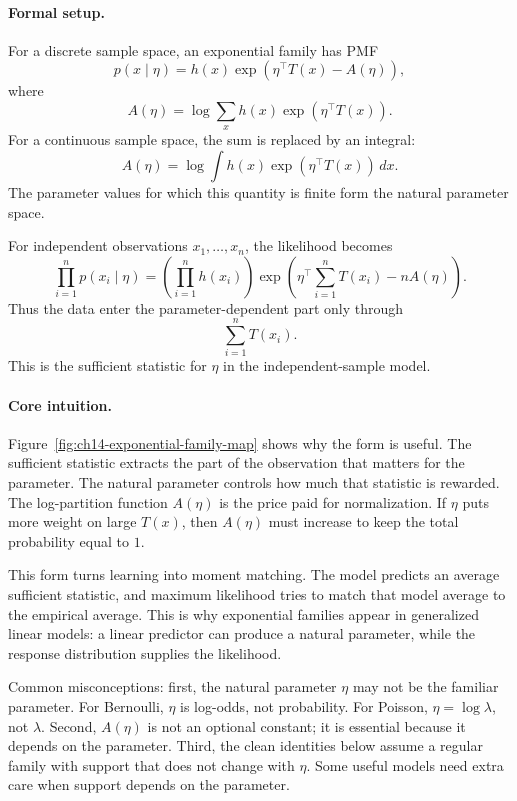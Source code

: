 \paragraph{Formal setup.}
For a discrete sample space, an exponential family has PMF
\[
\boxed{
p(x\mid\eta)=h(x)\exp\!\left(\eta^\top T(x)-A(\eta)\right),
}
\]
where
\[
A(\eta)=\log\sum_x h(x)\exp\!\left(\eta^\top T(x)\right).
\]
For a continuous sample space, the sum is replaced by an integral:
\[
A(\eta)=\log\int h(x)\exp\!\left(\eta^\top T(x)\right)\,dx.
\]
The parameter values for which this quantity is finite form the natural parameter space.

For independent observations \(x_1,\ldots,x_n\), the likelihood becomes
\[
\prod_{i=1}^n p(x_i\mid\eta)
=
\left(\prod_{i=1}^n h(x_i)\right)
\exp\!\left(\eta^\top\sum_{i=1}^n T(x_i)-nA(\eta)\right).
\]
Thus the data enter the parameter-dependent part only through
\[
\sum_{i=1}^n T(x_i).
\]
This is the sufficient statistic for \(\eta\) in the independent-sample model.

\paragraph{Core intuition.}
Figure~\ref{fig:ch14-exponential-family-map} shows why the form is useful. The sufficient statistic extracts the part of the observation that matters for the parameter. The natural parameter controls how much that statistic is rewarded. The log-partition function \(A(\eta)\) is the price paid for normalization. If \(\eta\) puts more weight on large \(T(x)\), then \(A(\eta)\) must increase to keep the total probability equal to \(1\).

This form turns learning into moment matching. The model predicts an average sufficient statistic, and maximum likelihood tries to match that model average to the empirical average. This is why exponential families appear in generalized linear models: a linear predictor can produce a natural parameter, while the response distribution supplies the likelihood.

Common misconceptions: first, the natural parameter \(\eta\) may not be the familiar parameter. For Bernoulli, \(\eta\) is log-odds, not probability. For Poisson, \(\eta=\log\lambda\), not \(\lambda\). Second, \(A(\eta)\) is not an optional constant; it is essential because it depends on the parameter. Third, the clean identities below assume a regular family with support that does not change with \(\eta\). Some useful models need extra care when support depends on the parameter.

